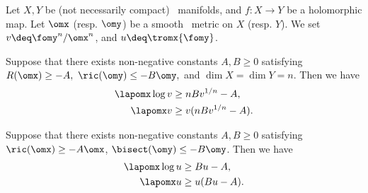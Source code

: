 \documentclass[12pt]{amsart}
\begin{document}
\begin{proposition}\label{LapProp}
Let $X,Y$ be (not necessarily compact) \kahler \ manifolds, and $f \colon X \rightarrow Y$ be a holomorphic map. Let $\omx$ (resp. $\omy$) be a smooth \kahler \ metric on $X$ (resp. $Y$). 
We set $v \deq \fomy^n/\omx^n$, and $u \deq \tromx{\fomy}$.
\begin{enua}
	\item Suppose that there exists non-negative constants $A, B\ge  0$ satisfying
$
		R(\omx) \ge -A, \ \ric(\omy) \le -B \omy, 
$
	and $\dim X = \dim Y = n$. Then we have
		\begin{align*}
			\lapomx \log v 
				&\ge nB  v^{1/n} - A, \\ 
			\lapomx v 
				&\ge v ( nB  v^{1/n} - A  ).
		\end{align*}
	\item Suppose that there exists non-negative constants $A, B\ge  0$ satisfying $\ric (\omx) \ge -A\omx$, $\bisect ( \omy ) \le -B \omy$.
		Then we have
		\begin{align*}
			\lapomx \log  u 
				&\ge Bu-A, \\
			\lapomx u 
				&\ge u (Bu-A ).
		\end{align*}		
\end{enua}
\end{proposition}
\vspace{10pt}
\end{document}
